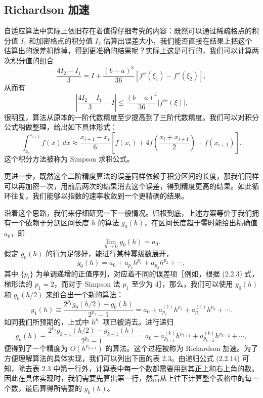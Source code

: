 \subsection{Richardson 加速}

自适应算法中实际上依旧存在着值得仔细考究的内容：既然可以通过稀疏格点的积分值 $I_1$ 和加密格点的积分值 $I_2$ 估算出误差大小，我们能否直接在结果上把这个估算出的误差扣除掉，得到更准确的结果呢？实际上这是可行的，我们可以计算两次积分值的组合
\[
\frac{4I_2-I_1}{3}=I+\frac{(b-a)^3}{36}[f''(\xi_1)-f''(\xi_2)],
\]
从而有
\[
\left|\frac{4I_2-I_1}{3}-I\right|\le\frac{(b-a)^4}{36}|f'''(\xi)|.
\]
很明显，算法从原本的一阶代数精度至少提高到了三阶代数精度。我们可以对积分公式稍做整理，给出如下具体形式：
\begin{equation}
\int_{x_i}^{x_{i+1}}f(x)\,dx\approx\frac{x_{i+1}-x_i}{6}\left[f(x_i)+4f\left(\frac{x_i+x_{i+1}}2\right)+f(x_{i+1})\right].
\tag{2.2.10}
\end{equation}
这个积分方法被称为 Simpson 求积公式。

更进一步，既然这个二阶精度算法的误差同样依赖于积分区间的长度，那我们同样可以再加密一次，用前后两次的结果消去这个误差，得到精度更高的结果。如此循环往复，我们能够以指数的速率收敛到一个更精确的结果。

沿着这个思路，我们来仔细研究一下一般情况。归根到底，上述方案等价于我们拥有一个依赖于分割区间长度 $h$ 的算法 $g_0(h)$，在区间长度趋于零时能给出精确值 $a_0$，即
\begin{equation}
\lim_{h\to0}g_0(h)=a_0.
\tag{2.2.11}
\end{equation}
假定 $g_0(h)$ 的行为足够好，能进行某种幂级数展开，
\begin{equation}
g_0(h)=a_0+a_{p_1}h^{p_1}+a_{p_2}h^{p_2}+\cdots,
\tag{2.2.12}
\end{equation}
其中 $\{p_i\}$ 为单调递增的正值序列，对应着不同的误差项［例如，根据 (2.2.3) 式，梯形法的 $p_1=2$，而对于 Simpson 法 $p_1$ 至少为 4］，那么，我们可以使用 $g_0(h)$ 和 $g_0(h/2)$ 来组合出一个新的算法：
\begin{equation}
g_1(h)\equiv\frac{2^{p_1}g_0(h/2)-g_0(h)}{2^{p_1}-1}
=a_0+a_{p_2}^{(1)}h^{p_2}+a_{p_3}^{(1)}h^{p_3}+\cdots.
\tag{2.2.13}
\end{equation}
如同我们所预期的，上式中 $h^{p_1}$ 项已被消去。进行递归
\begin{equation}
g_k(h)\equiv\frac{2^{p_k}g_{k-1}(h/2)-g_{k-1}(h)}{2^{p_k}-1}
=a_0+a_{p_{k+1}}^{(k)}h^{p_{k+1}}+a_{p_{k+2}}^{(k)}h^{p_{k+2}}+\cdots,
\tag{2.2.14}
\end{equation}
便得到了一个精度为 $O(h^{p_{k+1}})$ 的算法。这个过程被称为 Richardson 加速。为了方便理解算法的具体实现，我们可以列出下面的表 2.3。由递归公式 (2.2.14) 可知，除去表 2.3 中第一行外，计算表中每一个数都需要用到其正上和右上角的数。因此在具体实现时，我们需要先算出第一行，然后从上往下计算整个表格中的每一个数，最后算得所需要的 $g_k(h)$。

